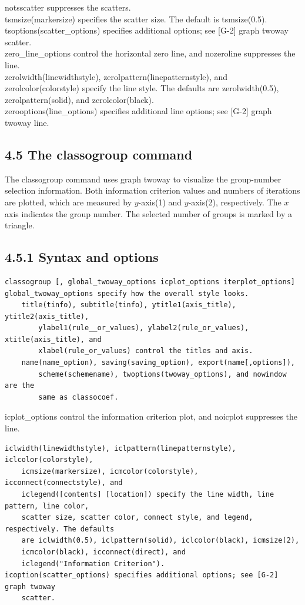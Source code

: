 \documentclass[10pt]{article}
\begin{document}
notsscatter suppresses the scatters.\\
tsmsize(markersize) specifies the scatter size. The default is tsmsize(0.5).\\[0pt]
tsoptions(scatter\_options) specifies additional options; see [G-2] graph twoway scatter.\\
zero\_line\_options control the horizontal zero line, and nozeroline suppresses the line.\\
zerolwidth(linewidthstyle), zerolpattern(linepatternstyle), and zerolcolor(colorstyle) specify the line style. The defaults are zerolwidth(0.5), zerolpattern(solid), and zerolcolor(black).\\[0pt]
zerooptions(line\_options) specifies additional line options; see [G-2] graph twoway line.

\subsection*{4.5 The classogroup command}
The classogroup command uses graph twoway to visualize the group-number selection information. Both information criterion values and numbers of iterations are plotted, which are measured by $y$-axis(1) and $y$-axis(2), respectively. The $x$ axis indicates the group number. The selected number of groups is marked by a triangle.

\subsection*{4.5.1 Syntax and options}
\begin{verbatim}
classogroup [, global_twoway_options icplot_options iterplot_options]
global_twoway_options specify how the overall style looks.
    title(tinfo), subtitle(tinfo), ytitle1(axis_title), ytitle2(axis_title),
        ylabel1(rule__or_values), ylabel2(rule_or_values), xtitle(axis_title), and
        xlabel(rule_or_values) control the titles and axis.
    name(name_option), saving(saving_option), export(name[,options]),
        scheme(schemename), twoptions(twoway_options), and nowindow are the
        same as classocoef.
\end{verbatim}

icplot\_options control the information criterion plot, and noicplot suppresses the line.

\begin{verbatim}
iclwidth(linewidthstyle), iclpattern(linepatternstyle), iclcolor(colorstyle),
    icmsize(markersize), icmcolor(colorstyle), icconnect(connectstyle), and
    iclegend([contents] [location]) specify the line width, line pattern, line color,
    scatter size, scatter color, connect style, and legend, respectively. The defaults
    are iclwidth(0.5), iclpattern(solid), iclcolor(black), icmsize(2),
    icmcolor(black), icconnect(direct), and
    iclegend("Information Criterion").
icoption(scatter_options) specifies additional options; see [G-2] graph twoway
    scatter.
\end{verbatim}
\end{document}
